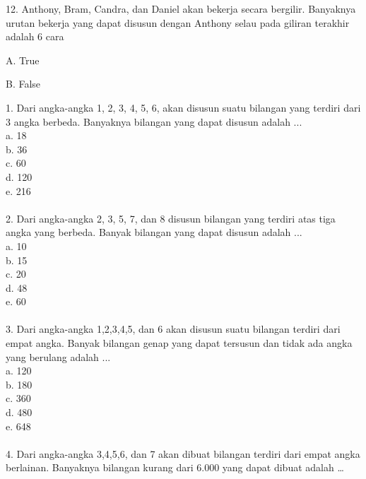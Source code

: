 \documentclass[11pt,fleqn]{book} %
\begin{document}
12. 
Anthony, Bram, Candra, dan Daniel akan bekerja secara bergilir. Banyaknya urutan bekerja yang dapat disusun dengan Anthony selau pada giliran terakhir adalah 6 cara

A. 
True

B. 
False

 1. Dari angka-angka 1, 2, 3, 4, 5, 6, akan disusun suatu bilangan yang terdiri dari 3 angka berbeda. Banyaknya bilangan yang dapat disusun adalah ...\\ 

a.	18\\

b.	36\\

c.	60\\

d.	120\\

e.	216\\
\\

2. Dari angka-angka 2, 3, 5, 7, dan 8 disusun bilangan yang terdiri atas tiga angka yang berbeda. Banyak bilangan yang dapat disusun adalah ...\\

a.	10\\

b.	15\\

c.	20\\

d.	48\\

e.	60\\
\\

3. Dari angka-angka 1,2,3,4,5, dan 6 akan disusun suatu bilangan terdiri dari empat angka. Banyak bilangan genap yang dapat tersusun dan tidak ada angka yang berulang adalah ...\\ 

a.	120\\

b.	180\\

c.	360\\

d.	480\\

e.	648\\
\\

4. Dari angka-angka 3,4,5,6, dan 7 akan dibuat bilangan terdiri dari empat angka berlainan. Banyaknya bilangan kurang dari 6.000 yang dapat dibuat adalah …\\ 
\end{document}
